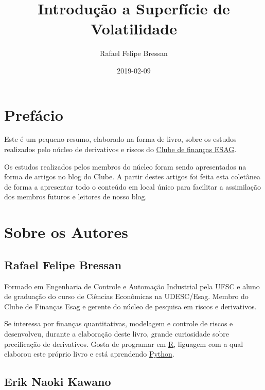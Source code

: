 \documentclass[]{book}
\title{Introdução a Superfície de Volatilidade}
\author{Rafael Felipe Bressan}
\date{2019-02-09}
\theoremstyle{definition}
\theoremstyle{definition}
\theoremstyle{definition}
\theoremstyle{remark}
\begin{document}
\maketitle

{
\setcounter{tocdepth}{1}
\tableofcontents
}
\chapter*{Prefácio}\label{prefacio}

Este é um pequeno resumo, elaborado na forma de livro, sobre os estudos
realizados pelo núcleo de derivativos e riscos do
\href{https://clubedefinancas.com.br}{Clube de finanças ESAG}.

Os estudos realizados pelos membros do núcleo foram sendo apresentados
na forma de artigos no blog do Clube. A partir destes artigos foi feita
esta coletânea de forma a apresentar todo o conteúdo em local único para
facilitar a assimilação dos membros futuros e leitores de nosso blog.

\chapter*{Sobre os Autores}\label{sobre-os-autores}

\section*{Rafael Felipe Bressan}\label{rafael-felipe-bressan}

Formado em Engenharia de Controle e Automação Industrial pela UFSC e
aluno de graduação do curso de Ciências Econômicas na UDESC/Esag. Membro
do Clube de Finanças Esag e gerente do núcleo de pesquisa em riscos e
derivativos.

Se interessa por finanças quantitativas, modelagem e controle de riscos
e desenvolveu, durante a elaboração deste livro, grande curiosidade
sobre precificação de derivativos. Gosta de programar em
\href{https://cran.r-project.org/}{R}, liguagem com a qual elaborou este
próprio livro e está aprendendo \href{https://www.python.org/}{Python}.

\section*{Erik Naoki Kawano}\label{erik-naoki-kawano}
\end{document}
